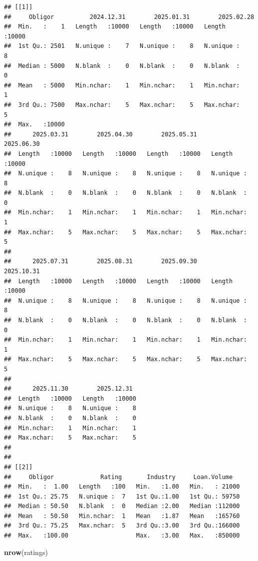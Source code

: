 \documentclass[
  11pt,
]{article}
\newenvironment{Shaded}{\begin{snugshade}}{\end{snugshade}}
\newcommand{\FunctionTok}[1]{\textcolor[rgb]{0.13,0.29,0.53}{\textbf{#1}}}
\newcommand{\NormalTok}[1]{#1}
\begin{document}
\begin{verbatim}
## [[1]]
##     Obligor          2024.12.31        2025.01.31        2025.02.28   
##  Min.   :    1   Length   :10000   Length   :10000   Length   :10000  
##  1st Qu.: 2501   N.unique :    7   N.unique :    8   N.unique :    8  
##  Median : 5000   N.blank  :    0   N.blank  :    0   N.blank  :    0  
##  Mean   : 5000   Min.nchar:    1   Min.nchar:    1   Min.nchar:    1  
##  3rd Qu.: 7500   Max.nchar:    5   Max.nchar:    5   Max.nchar:    5  
##  Max.   :10000                                                        
##      2025.03.31        2025.04.30        2025.05.31        2025.06.30   
##  Length   :10000   Length   :10000   Length   :10000   Length   :10000  
##  N.unique :    8   N.unique :    8   N.unique :    8   N.unique :    8  
##  N.blank  :    0   N.blank  :    0   N.blank  :    0   N.blank  :    0  
##  Min.nchar:    1   Min.nchar:    1   Min.nchar:    1   Min.nchar:    1  
##  Max.nchar:    5   Max.nchar:    5   Max.nchar:    5   Max.nchar:    5  
##                                                                         
##      2025.07.31        2025.08.31        2025.09.30        2025.10.31   
##  Length   :10000   Length   :10000   Length   :10000   Length   :10000  
##  N.unique :    8   N.unique :    8   N.unique :    8   N.unique :    8  
##  N.blank  :    0   N.blank  :    0   N.blank  :    0   N.blank  :    0  
##  Min.nchar:    1   Min.nchar:    1   Min.nchar:    1   Min.nchar:    1  
##  Max.nchar:    5   Max.nchar:    5   Max.nchar:    5   Max.nchar:    5  
##                                                                         
##      2025.11.30        2025.12.31   
##  Length   :10000   Length   :10000  
##  N.unique :    8   N.unique :    8  
##  N.blank  :    0   N.blank  :    0  
##  Min.nchar:    1   Min.nchar:    1  
##  Max.nchar:    5   Max.nchar:    5  
##                                     
## 
## [[2]]
##     Obligor             Rating       Industry     Loan.Volume    
##  Min.   :  1.00   Length   :100   Min.   :1.00   Min.   : 21000  
##  1st Qu.: 25.75   N.unique :  7   1st Qu.:1.00   1st Qu.: 59750  
##  Median : 50.50   N.blank  :  0   Median :2.00   Median :112000  
##  Mean   : 50.50   Min.nchar:  1   Mean   :1.87   Mean   :165760  
##  3rd Qu.: 75.25   Max.nchar:  5   3rd Qu.:3.00   3rd Qu.:166000  
##  Max.   :100.00                   Max.   :3.00   Max.   :850000
\end{verbatim}

\begin{Shaded}
\begin{Highlighting}[]
\FunctionTok{nrow}\NormalTok{(ratings)}
\end{Highlighting}
\end{Shaded}
\end{document}
